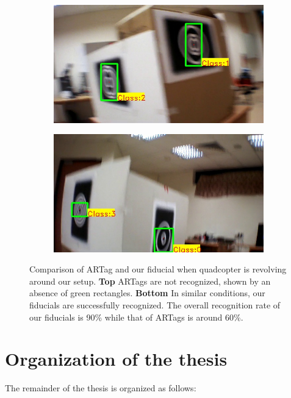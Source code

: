 \begin{figure}
\begin{subfigure}[b]{0.24\textwidth}
\end{subfigure}
\begin{subfigure}[b]{0.24\textwidth}
\includegraphics[width=\linewidth]{figures/fiducial/setup_our/output_2/output_35.jpg}
\end{subfigure}
\begin{subfigure}[b]{0.24\textwidth}
\includegraphics[width=\linewidth]{figures/fiducial/setup_our/output_6/output_943.jpg}
\end{subfigure}
\caption[Comparison of ARTag and our fiducial when quadcopter is
  revolving around our setup]{Comparison of ARTag and our fiducial when quadcopter is
  revolving around our setup. 
\textbf{Top} ARTags are not recognized, shown by an absence of green rectangles.
\textbf{Bottom} In similar conditions, our fiducials are successfully
recognized. The overall recognition rate of our fiducials is 90\% while that
of ARTags is around 60\%. }
\label{fig:fiducials_result}
\end{figure}
	
\section{Organization of the thesis}
The remainder of the thesis is organized as follows:\\

